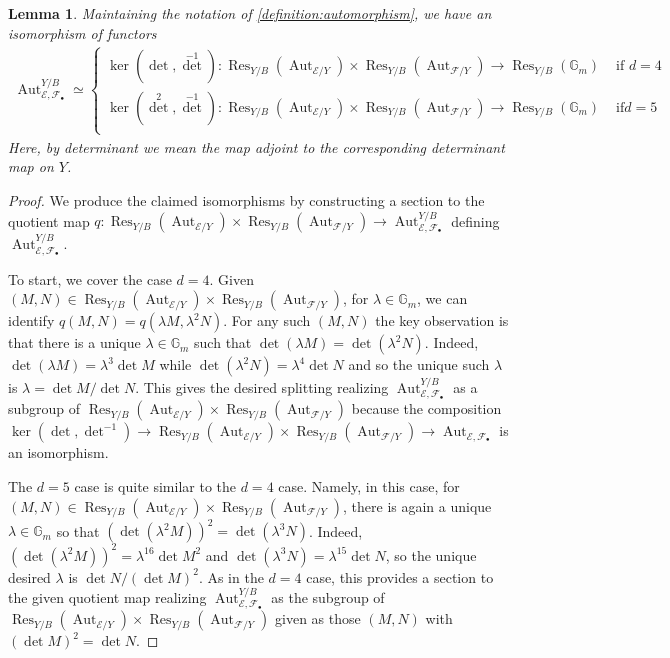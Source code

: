 \documentclass[12 pt]{amsart}
\theoremstyle{plain}
\newtheorem{lemma}[theorem]{Lemma}
\theoremstyle{definition}
\theoremstyle{remark}
\numberwithin{equation}{section}
\newcommand\bg{\mathbb G}
\newcommand\sce{\mathscr E}
\newcommand\scf{\mathscr F}
\newcommand \ra{\rightarrow}
\DeclareMathOperator\res{Res}
\DeclareMathOperator\aut{Aut}
\begin{document}
\begin{lemma}
	\label{lemma:aut-as-sub} Maintaining the notation of
	\autoref{definition:automorphism}, we have an isomorphism of functors
	\begin{align}
		\label{equation:aut-subs} \aut_{\sce, \scf_\bullet}^{Y/B} \simeq
		\begin{cases} \ker(\det,\det^{-1}): \res_{Y/B}(\aut_{\sce/Y})
			\times \res_{Y/B}(\aut_{\scf/Y}) \ra \res_{Y/B} (\bg_m) & \text{ if }
			d= 4 \\ \ker(\det^2,\det^{-1}):
			\res_{Y/B}(\aut_{\sce/Y}) \times
			\res_{Y/B}(\aut_{\scf/Y}) \ra \res_{Y/B}(\bg_m) & \text{ if
} d= 5 \\ \end{cases} \end{align} Here, by determinant we mean the map adjoint
to the corresponding determinant map on $Y$.  \end{lemma} 
\begin{proof} We
	produce the claimed isomorphisms by constructing a section to the quotient map $q :
	\res_{Y/B}(\aut_{\sce/Y}) \times \res_{Y/B}(\aut_{\scf/Y}) \to
	\aut_{\sce, \scf_\bullet}^{Y/B}$ defining $\aut_{\sce, \scf_\bullet}^{Y/B}$.

To start, we cover the case $d = 4$.  Given $(M, N) \in
\res_{Y/B}(\aut_{\sce/Y}) \times \res_{Y/B}(\aut_{\scf/Y})$, for $\lambda \in
\bg_m$, we can identify $q(M,N) = q(\lambda M, \lambda^2 N)$.  For any such
$(M,N)$ the key observation is that there is a unique $\lambda \in \bg_m$ such
that $\det (\lambda M) = \det( \lambda^2 N)$.  Indeed, $\det (\lambda M) =
\lambda^3 \det M$ while $\det( \lambda^2 N) = \lambda^4 \det N$ and so the
unique such $\lambda$ is $\lambda = \det M/\det N$.  This gives the desired
splitting realizing $\aut_{\sce, \scf_\bullet}^{Y/B}$ as a subgroup of
$\res_{Y/B}(\aut_{\sce/Y}) \times \res_{Y/B}(\aut_{\scf/Y})$ because the
composition $\ker(\det, \det^{-1}) \to \res_{Y/B}(\aut_{\sce/Y}) \times
\res_{Y/B}(\aut_{\scf/Y}) \to \aut_{\sce, \scf_\bullet}$ is an isomorphism.

The $d = 5$ case is quite similar to the $d = 4$ case.  Namely, in this case,
for $(M, N) \in \res_{Y/B}(\aut_{\sce/Y}) \times \res_{Y/B}(\aut_{\scf/Y})$,
there is again a unique $\lambda \in \bg_m$ so that $(\det (\lambda^2 M))^2 =
\det(\lambda^3 N)$.  Indeed, $(\det (\lambda^2 M))^2 = \lambda^{16} \det M^2$
and $\det(\lambda^3 N) = \lambda^{15} \det N$, so the unique desired $\lambda$
is $\det N/(\det M)^2$.  As in the $d = 4$ case, this provides a section to the
given quotient map realizing $\aut_{\sce, \scf_\bullet}^{Y/B}$ as the subgroup
of $\res_{Y/B}(\aut_{\sce/Y}) \times \res_{Y/B}(\aut_{\scf/Y})$ given as those
$(M,N)$ with $(\det M)^2 = \det N$.  \end{proof}
\end{document}

